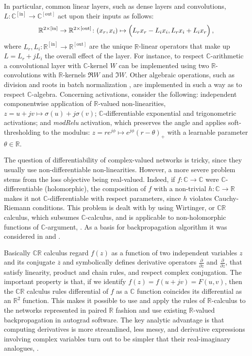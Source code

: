 \documentclass[a4paper,10pt]{article}
\newcommand{\real}{\mathbb{R}}
\newcommand{\cplx}{\mathbb{C}}
\newcommand{\conj}[1]{\overline{#1}}
\begin{document}
In particular, common linear layers, such as dense layers and convolutions,
$
  L \colon \cplx^{\mathrm{[in]}}
    \to \cplx^{\mathrm{[out]}}
$ act upon their inputs as follows:
$$
\real^{2 \times \mathrm{[in]}}
  \to \real^{2 \times \mathrm{[out]}}
  \colon (x_r, x_i)
    \mapsto \Bigl(
      L_r x_r - L_i x_i,
      L_r x_i + L_i x_r
    \Bigr)
  \,, $$
where $
  L_r, L_i
    \colon \real^{\mathrm{[in]}}
      \to \real^{\mathrm{[out]}}
$ are the unique $\real$-linear operators that make up $L = L_r + j L_i$ the overall
effect of the layer. For instance, to respect $\cplx$-arithmetic a convolutional layer with
$\cplx$-kernel $W$ can be implemented using two $\real$-convolutions with $\real$-kernels
$\Re{W}$ and $\Im{W}$. Other algebraic operations, such as division and roots in batch
normalization \cite{trabelsi_deep_2017}, are implemented in such a way as to respect
$\cplx$-algebra.
%
Concerning activations, \cite{trabelsi_deep_2017} consider the following: independent
componentwise application of $\real$-valued non-linearities, $
  z = u + j v
    \mapsto \sigma(u) + j \sigma(v)
$; $\cplx$-differentiable exponential and trigonometric activations; and \textit{modRelu}
activation, which preserves the angle and applies soft-thresholding to the modulus: $
  z = r e^{j \phi}
    \mapsto e^{j \phi} (r - \theta)_+
$ with a learnable parameter $\theta\in \real$. 

The question of differentiability of complex-valued networks is tricky, since they usually
use non-differentiable non-linearities. However, a more severe problem stems from the loss
objective being real-valued. Indeed, if $f\colon \cplx \to \cplx$ were $\cplx$-differentiable
(holomorphic), the composition of $f$ with a non-trivial $h \colon \cplx\to \real$ makes it
not $\cplx$-differentiable with respect parameters, since $h$ violates Cauchy-Riemann conditions.
This problem is dealt with by using Wirtinger, or $\cplx\real$ calculus, which subsumes
$\cplx$-calculus, and is applicable to non-holomorphic functions of $\cplx$-argument,
\cite{adali_complex-valued_2011}. As a basis for backpropagation algorithm it was considered
in \cite{benvenuto_complex_1992} and \cite{trabelsi_deep_2017}.

Basically $\cplx\real$ calculus regard $f(z)$ as a function of two independent variables $z$ 
and its conjugate $\conj{z}$ and symbolically defines derivative operators $
  \tfrac{\partial}{\partial z}
$ and $
  \tfrac{\partial}{\partial \conj{z}}
$, that satisfy linearity, product and chain rules, and respect complex conjugation. The important
property is that, if we identify $f(z) = f(u + jv) = F(u, v)$, then the $\cplx\real$ calculus
rules differential of $f$ as a $\cplx$ function coincides its differential as an $\real^2$
function. This makes it possible to use and apply the rules of $\real$-calculus to the networks
represented in paired $\real$ fashion and use existing $\real$-valued backpropagation in autograd
software. The key analytic advantage is that computing derivatives is more streamlined, less
messy, and derivative expressions involving complex variables turn out to be simpler that their
real-imaginary analogues, \cite{adali_complex-valued_2011}.
\end{document}
